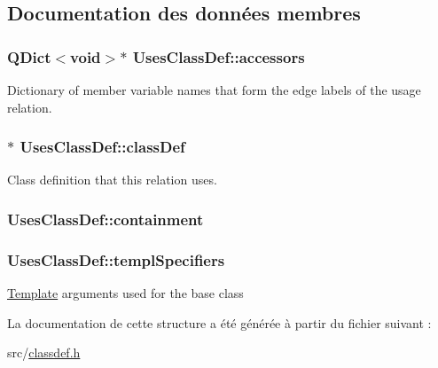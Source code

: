 \subsection{Documentation des données membres}
\hypertarget{struct_uses_class_def_a41838afce51128c142e9fbb4998aa7c6}{}
\subsubsection[{accessors}]{\setlength{\rightskip}{0pt plus 5cm}Q\+Dict$<$void$>$$\ast$ Uses\+Class\+Def\+::accessors}\label{struct_uses_class_def_a41838afce51128c142e9fbb4998aa7c6}
Dictionary of member variable names that form the edge labels of the usage relation. \hypertarget{struct_uses_class_def_ae9ace813f9031b4afb6894e5ad15f901}{}
\subsubsection[{class\+Def}]{$\ast$ Uses\+Class\+Def\+::class\+Def}\label{struct_uses_class_def_ae9ace813f9031b4afb6894e5ad15f901}
Class definition that this relation uses. \hypertarget{struct_uses_class_def_a0373cf528ea065d333d13b085cf50b90}{}
\subsubsection[{containment}]{ Uses\+Class\+Def\+::containment}\label{struct_uses_class_def_a0373cf528ea065d333d13b085cf50b90}
\hypertarget{struct_uses_class_def_a5f65373ed5c0409ef538193d0e58f06d}{}
\subsubsection[{templ\+Specifiers}]{ Uses\+Class\+Def\+::templ\+Specifiers}\label{struct_uses_class_def_a5f65373ed5c0409ef538193d0e58f06d}
\hyperlink{class_template}{Template} arguments used for the base class 

La documentation de cette structure a été générée à partir du fichier suivant \+:\begin{DoxyCompactItemize}
\item 
src/\hyperlink{classdef_8h}{classdef.\+h}\end{DoxyCompactItemize}
